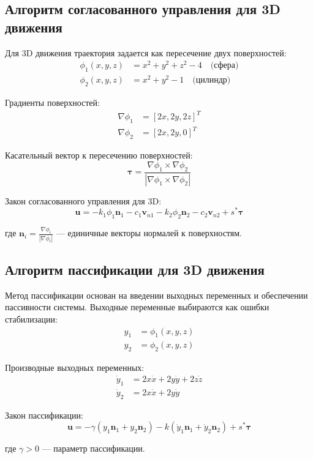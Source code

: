 \subsection{Алгоритм согласованного управления для 3D движения}

Для 3D движения траектория задается как пересечение двух поверхностей:
\begin{align}
\phi_1(x, y, z) &= x^2 + y^2 + z^2 - 4 \quad \text{(сфера)} \\
\phi_2(x, y, z) &= x^2 + y^2 - 1 \quad \text{(цилиндр)}
\end{align}

Градиенты поверхностей:
\begin{align}
\nabla\phi_1 &= [2x, 2y, 2z]^T \\
\nabla\phi_2 &= [2x, 2y, 0]^T
\end{align}

Касательный вектор к пересечению поверхностей:
$$\boldsymbol{\tau} = \frac{\nabla\phi_1 \times \nabla\phi_2}{|\nabla\phi_1 \times \nabla\phi_2|}$$

Закон согласованного управления для 3D:
$$\mathbf{u} = -k_1\phi_1\mathbf{n}_1 - c_1\mathbf{v}_{n1} - k_2\phi_2\mathbf{n}_2 - c_2\mathbf{v}_{n2} + s^*\boldsymbol{\tau}$$

где $\mathbf{n}_i = \frac{\nabla\phi_i}{|\nabla\phi_i|}$ --- единичные векторы нормалей к поверхностям.

\subsection{Алгоритм пассификации для 3D движения}

Метод пассификации основан на введении выходных переменных и обеспечении пассивности системы. Выходные переменные выбираются как ошибки стабилизации:
\begin{align}
y_1 &= \phi_1(x, y, z) \\
y_2 &= \phi_2(x, y, z)
\end{align}

Производные выходных переменных:
\begin{align}
\dot{y}_1 &= 2x\dot{x} + 2y\dot{y} + 2z\dot{z} \\
\dot{y}_2 &= 2x\dot{x} + 2y\dot{y}
\end{align}

Закон пассификации:
$$\mathbf{u} = -\gamma(y_1\mathbf{n}_1 + y_2\mathbf{n}_2) - k(\dot{y}_1\mathbf{n}_1 + \dot{y}_2\mathbf{n}_2) + s^*\boldsymbol{\tau}$$

где $\gamma > 0$ --- параметр пассификации.

